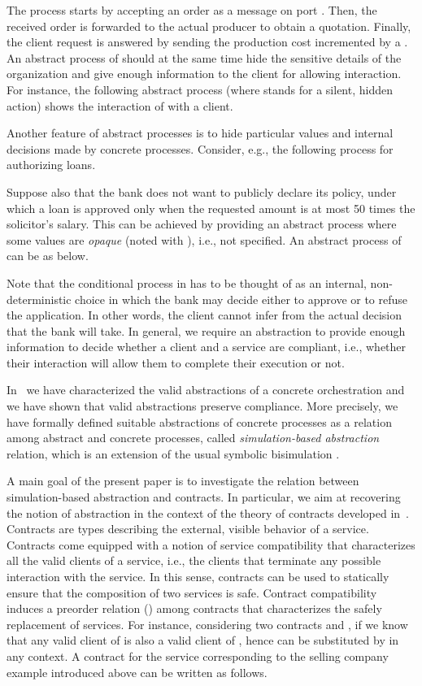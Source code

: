 \documentclass[submission,copyright,creativecommons]{eptcs}
\begin{document}
The process  starts by accepting an order as a message on port .  
Then, the received order is forwarded to the actual producer  to obtain a 
quotation. Finally, the client request is answered by sending the production cost 
incremented by a . An abstract process of  should at the same time hide 
the sensitive details of the organization and give enough information to the client for 
allowing interaction. For instance, the following abstract process (where 
 stands for a silent, hidden action) shows the interaction of  with a client.

Another feature of abstract processes is to hide particular values and 
internal decisions made by concrete processes. Consider, e.g., the following 
process for authorizing loans.
\begin{small}

\end{small}
 Suppose also that the bank does not want to publicly declare its policy, under which 
 a loan is approved only when the requested amount is at most 50 times the solicitor's salary. 
 This can be achieved by providing an abstract process where some values are
 {\it opaque} (noted with ), i.e., not specified. An abstract process of  can be as below.

Note that the conditional process in  has to be thought of as an
internal, non-deterministic choice in which the bank may decide either
to approve or to refuse the application. In other words, the client cannot
infer from    the actual decision that the bank will take. In general, we 
require an abstraction to provide enough information to decide whether a client and a 
service are compliant, i.e., whether their interaction will allow them to complete their 
execution or not.


In~\cite{BM:APOL} we have characterized the valid abstractions of a 
concrete orchestration and we have shown that valid abstractions preserve
compliance. More precisely, we have formally defined suitable abstractions of concrete processes
as a relation among abstract and concrete processes, called \emph{simulation-based abstraction} relation,
which is an extension of the usual symbolic bisimulation \cite{HL:SB,BD:SSPC}. 

A main goal of the present paper is to investigate the relation between simulation-based abstraction 
and contracts. In particular, we aim at recovering the notion of abstraction in the context of 
the theory of contracts developed in~\cite{CGP09:TCWS}. 
Contracts are types describing the external, visible behavior of a service. Contracts come 
equipped with a notion of service compatibility that characterizes all the valid clients of a service, i.e., 
the clients that terminate any possible interaction with the service. 
In this sense, contracts can be used to statically ensure that the composition of two services
is safe. Contract compatibility induces a preorder relation () among contracts that characterizes 
the safely replacement of services. For instance,  considering two contracts  and , if 
 we know that any valid client of  is also a valid client of ,
hence  can be substituted by  in any context. 
A contract for the service  corresponding to the selling company example introduced above can be 
written as follows. 
\end{document}
